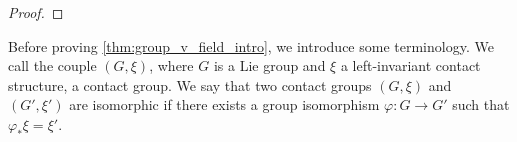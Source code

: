 \documentclass[reqno]{amsart}
\theoremstyle{remark}
\theoremstyle{plain}
\begin{document}
\begin{proof}

\end{proof}
Before proving \cref{thm:group_v_field_intro}, we introduce some terminology. We call the couple $(G,\xi)$, where $G$ is a Lie group and $\xi$ a left-invariant contact structure, a contact group. We say that two contact groups $(G,\xi)$ and $(G',\xi')$ are isomorphic if there exists a group isomorphism $\varphi:G\to G'$ such that $\varphi_*\xi=\xi'$.
\end{document}
